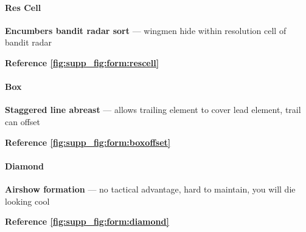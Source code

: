 \paragraph{Res Cell} 
\textbf{Encumbers bandit radar sort}
--- wingmen hide within resolution cell of bandit radar

\medskip
\hfill\textbf{Reference \cref{fig:supp_fig:form:rescell}}

\paragraph{Box} 
\textbf{Staggered line abreast}
--- allows trailing element to cover lead element, trail can offset 

\medskip
\hfill\textbf{Reference \cref{fig:supp_fig:form:boxoffset}}

\paragraph{Diamond}
\textbf{Airshow formation}
--- no tactical advantage, hard to maintain,
you will die looking cool

\medskip
\hfill\textbf{Reference \cref{fig:supp_fig:form:diamond}}

